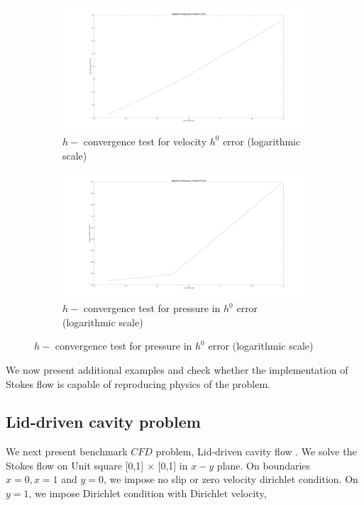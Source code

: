 \documentclass[a4paper]{book}
\begin{document}
\begin{figure}
\begin{subfigure}{\textwidth}	
  \includegraphics[width=\linewidth]{h0_velocity_log_stokes.jpg}
  \caption{$h-$ convergence test for velocity $h^0$ error (logarithmic scale)}
  \label{fig:vel_stoke_conv_log_h0}
\end{subfigure}
\begin{subfigure}{\textwidth}	
  \includegraphics[width=\linewidth]{h0_pressure_log_stokes.jpg}
  \caption{$h-$ convergence test for pressure in $h^0$ error (logarithmic scale)}
  \label{fig:pre_stoke_conv_log_h0}
\end{subfigure}
\label{fig:h0_stokes}
\end{figure}

We now present additional examples and check whether the implementation of Stokes flow is capable of reproducing physics of the problem.

\subsection{Lid-driven cavity problem} \label{lid_driven_cavity_stokes}

We next present benchmark $CFD$ problem, Lid-driven cavity flow \cite{Montlaur2}. We solve the Stokes flow on Unit square [0,1] $\times$ [0,1] in $x-y$ plane. On boundaries ${x = 0}, {x = 1}$ and ${y = 0}$, we impose no slip or zero velocity dirichlet condition. On ${y = 1}$, we impose Dirichlet condition with Dirichlet velocity,
\end{document}
